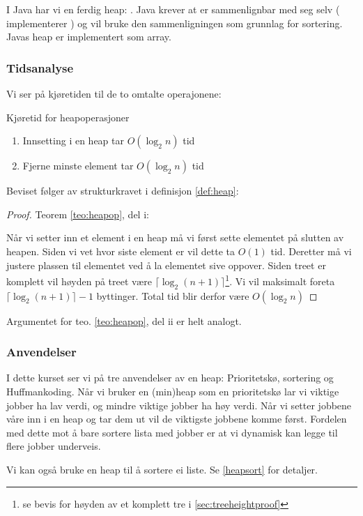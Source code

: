I Java har vi en ferdig heap: . Java krever at  er sammenlignbar med seg selv ( implementerer ) og vil bruke den sammenligningen som grunnlag for sortering. Javas heap er implementert som array. 

\subsubsection{Tidsanalyse}
Vi ser på kjøretiden til de to omtalte operajonene:
\begin{theorem} Kjøretid for heapoperasjoner \label{teo:heapop}
	\begin{enumerate}
		\item Innsetting i en heap tar $ O(\log_2 n) $ tid
		\item Fjerne minste element tar $ O(\log_2 n) $ tid
	\end{enumerate}
\end{theorem}
Beviset følger av strukturkravet i definisjon \ref{def:heap}:
\begin{proof} Teorem \ref{teo:heapop}, del i:
	
	Når vi setter inn et element i en heap må vi først sette elementet på slutten av heapen. Siden vi vet hvor siste element er vil dette ta $ O(1) $ tid. Deretter må vi justere plassen til elementet ved å la elementet sive oppover. Siden treet er komplett vil høyden på treet være $ \lceil\log_2 (n+1)\rceil $\footnote{se bevis for høyden av et komplett tre i \ref{sec:treeheightproof}}. Vi vil maksimalt foreta $ \lceil\log_2 (n+1)\rceil - 1 $ byttinger. Total tid blir derfor være $ O(\log_2 n) $
\end{proof}
Argumentet for teo. \ref{teo:heapop}, del ii er helt analogt. 


\subsubsection{Anvendelser}
I dette kurset ser vi på tre anvendelser av en heap: Prioritetskø, sortering og Huffmankoding. Når vi bruker en (min)heap som en prioritetskø lar vi viktige jobber ha lav verdi, og mindre viktige jobber ha høy verdi. Når vi setter jobbene våre inn i en heap og tar dem ut vil de viktigste jobbene komme først. Fordelen med dette mot å bare sortere lista med jobber er at vi dynamisk kan legge til flere jobber underveis. 

Vi kan også bruke en heap til å sortere ei liste. Se \ref{heapsort} for detaljer.

